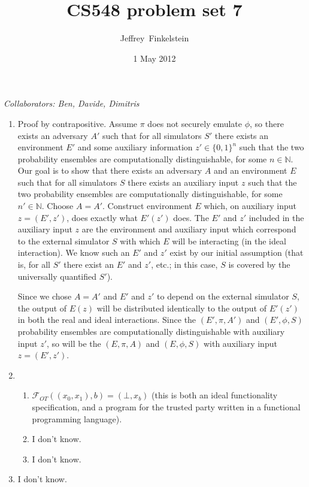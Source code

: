 \documentclass[draft]{article}
\author{Jef{}frey~Finkelstein}
\date{1 May 2012}
\title{CS548 problem set 7}
\newcommand{\collaborators}[1]{\emph{Collaborators: #1}}
\begin{document}
\maketitle
\collaborators{Ben, Davide, Dimitris}
\begin{enumerate}
\item
  Proof by contrapositive.
  Assume $\pi$ does not securely emulate $\phi$, so there exists an adversary $A'$ such that for all simulators $S'$ there exists an environment $E'$ and some auxiliary information $z'\in\{0, 1\}^n$ such that the two probability ensembles are computationally distinguishable, for some $n\in\mathbb{N}$.
  Our goal is to show that there exists an adversary $A$ and an environment $E$ such that for all simulators $S$ there exists an auxiliary input $z$ such that the two probability ensembles are computationally distinguishable, for some $n'\in\mathbb{N}$.
  Choose $A=A'$.
  Construct environment $E$ which, on auxiliary input $z=(E', z')$, does exactly what $E'(z')$ does.
  The $E'$ and $z'$ included in the auxiliary input $z$ are the environment and auxiliary input which correspond to the external simulator $S$ with which $E$ will be interacting (in the ideal interaction).
  We know such an $E'$ and $z'$ exist by our initial assumption (that is, for all $S'$ there exist an $E'$ and $z'$, etc.; in this case, $S$ is covered by the universally quantified $S'$).

  Since we chose $A=A'$ and $E'$ and $z'$ to depend on the external simulator $S$, the output of $E(z)$ will be distributed identically to the output of $E'(z')$ in both the real and ideal interactions.
  Since the $(E', \pi, A')$ and $(E', \phi, S)$ probability ensembles are computationally distinguishable with auxiliary input $z'$, so will be the $(E, \pi, A)$ and $(E, \phi, S)$ with auxiliary input $z=(E', z')$.
\item
  \begin{enumerate}
  \item $\mathcal{F}_{OT}((x_0, x_1), b)=(\bot, x_b)$ (this is both an ideal functionality specification, and a program for the trusted party written in a functional programming language).
  \item I don't know.
  \item I don't know.
  \end{enumerate}
\item I don't know.
\end{enumerate}
\end{document}
